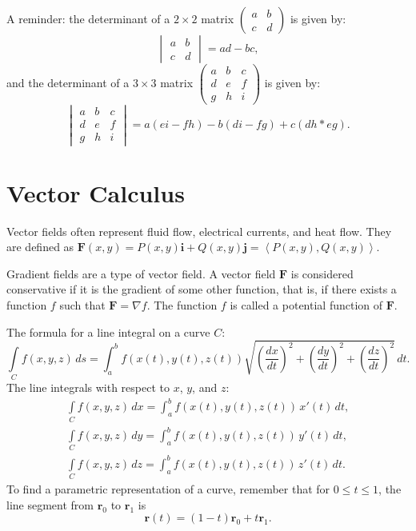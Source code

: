 \documentclass{article}
\begin{document}
A reminder: the determinant of a 
$2 \times 2$ matrix $\begin{pmatrix} a & b \\ c & d \end{pmatrix}$ is given by: 
\[ 
\begin{vmatrix} 
a & b \\ 
c & d 
\end{vmatrix} = ad - bc,
\]
and the determinant of a 
$3 \times 3$ matrix $\begin{pmatrix} a & b & c \\ d & e & f \\ g & h & i \end{pmatrix}$ is given by:
\[
\begin{vmatrix}
    a & b & c \\ 
    d & e & f \\ 
    g & h & i
\end{vmatrix} = 
a(ei - fh) - b(di - fg) + c(dh * eg).
\]

\section*{Vector Calculus}

Vector fields often represent fluid flow, electrical currents, and heat flow.
They are defined as $\mathbf{F}(x,y) = P(x,y)\mathbf{i} + Q(x,y)\mathbf{j}
= \left\langle P(x,y), Q(x,y) \right\rangle$.

Gradient fields are a type of vector field. A vector field $\mathbf{F}$ is 
considered conservative if it is the gradient of some other function, 
that is, if there exists a function $f$ such that $\mathbf{F} = \nabla f$. 
The function $f$ is called a potential function of $\mathbf{F}$.

The formula for a line integral on a curve $C$:
\[
\int \limits_C f(x,y,z) \, ds = 
\int_a^b f(x(t), y(t), z(t))
 \sqrt{\left(\frac{dx}{dt}\right)^2 + \left(\frac{dy}{dt}\right)^2 + \left(\frac{dz}{dt}\right)^2} \, dt.
\]
The line integrals with respect to $x$, $y$, and $z$:
\begin{gather}
    \int \limits_C f(x,y,z) \, dx = \int_{a}^{b} f(x(t), y(t), z(t)) \, x'(t) \, dt, \nonumber \\
    \int \limits_C f(x,y,z) \, dy = \int_{a}^{b} f(x(t), y(t), z(t)) \, y'(t) \, dt, \nonumber \\
    \int \limits_C f(x,y,z) \, dz = \int_{a}^{b} f(x(t), y(t), z(t)) \, z'(t) \, dt. \nonumber
\end{gather}
To find a parametric representation of a curve, remember that for $0 \le t \le 1$,
the line segment from $\mathbf{r}_0$ to $\mathbf{r}_1$ is
\[
\mathbf{r}(t) = (1-t)\mathbf{r}_0 + t\mathbf{r}_1.
\]
\end{document}
